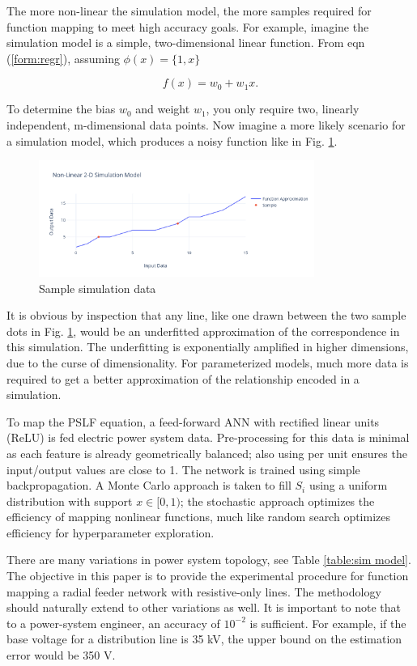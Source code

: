 \documentclass[conference]{IEEEtran}
\begin{document}
The more non-linear the simulation model, the more samples required for function mapping to meet high accuracy goals. For example, imagine the simulation model is a simple, two-dimensional linear function. From eqn (\ref{form:regr}), assuming $\phi(x) = \{1, x\}$

\begin{equation} f(x) = w_{0} + w_{1} x. \label{form: line} \end{equation}

To determine the bias $w_{0}$ and weight $w_{1}$, you only require two, linearly independent, m-dimensional data points. Now imagine a more likely scenario for a simulation model, which produces a noisy function like in Fig. \ref{fig:simdata}.

\begin{figure}[H]
	\centering
	\includegraphics[width=9cm]{simdata.pdf}
	\caption{Sample simulation data}
	\label{fig:simdata}
\end{figure}

It is obvious by inspection that any line, like one drawn between the two sample dots in Fig. \ref{fig:simdata}, would be an underfitted approximation of the correspondence in this simulation. The underfitting is exponentially amplified in higher dimensions, due to the curse of dimensionality. For parameterized models, much more data is required to get a better approximation of the relationship encoded in a simulation.

To map the PSLF equation, a feed-forward ANN with rectified linear units (ReLU) is fed electric power system data. Pre-processing for this data is minimal as each feature is already geometrically balanced; also using per unit ensures the input/output values are close to 1. The network is trained using simple backpropagation. A Monte Carlo approach is taken to fill $S_{i}$ using a uniform distribution with support $x \in [0, 1)$; the stochastic approach optimizes the efficiency of mapping nonlinear functions, much like random search optimizes efficiency for hyperparameter exploration\cite{berg2012}.

There are many variations in power system topology, see Table \ref{table:sim model}. The objective in this paper is to provide the experimental procedure for function mapping a radial feeder network with resistive-only lines. The methodology should naturally extend to other variations as well. It is important to note that to a power-system engineer, an accuracy of $10^{-2}$ is sufficient. For example, if the base voltage for a distribution line is 35 kV, the upper bound on the estimation error would be 350 V.
\end{document}

